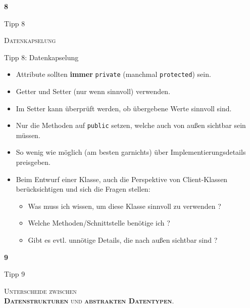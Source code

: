 \documentclass[18pt]{beamer}
\begin{document}
\begin{frame}{\quad}
    \center
    \Huge{\textbf{8}}
\end{frame}

\begin{frame}{Tipp 8}
    \begin{block}{}
        \center
        \textsc{Datenkapselung}
    \end{block}
\end{frame}

\begin{frame}{Tipp 8: Datenkapselung}
    \begin{itemize}
        \item Attribute sollten \textbf{immer} \texttt{private} (manchmal \texttt{protected}) sein.
        \item Getter und Setter (nur wenn sinnvoll) verwenden.
        \item Im Setter kann überprüft werden, ob übergebene Werte sinnvoll sind.
        \item Nur die Methoden auf \texttt{public} setzen, welche auch von außen sichtbar sein müssen.
        \item So wenig wie möglich (am besten garnichts) über Implementierungsdetails preisgeben.
        \item Beim Entwurf einer Klasse, auch die Perspektive von Client-Klassen berücksichtigen und sich die Fragen stellen:\\
        \begin{itemize}
            \item Was muss ich wissen, um diese Klasse sinnvoll zu verwenden ?
            \item Welche Methoden/Schnittstelle benötige ich ?
            \item Gibt es evtl. unnötige Details, die nach außen sichtbar sind ?
        \end{itemize}

    \end{itemize}
\end{frame}

\begin{frame}{\quad}
    \center
    \Huge{\textbf{9}}
\end{frame}

\begin{frame}{Tipp 9}
    \begin{block}{}
        \center
        \textsc{Unterscheide zwischen\\ \textbf{Datenstrukturen} und \textbf{abstrakten Datentypen}.}
    \end{block}
\end{frame}
\end{document}
